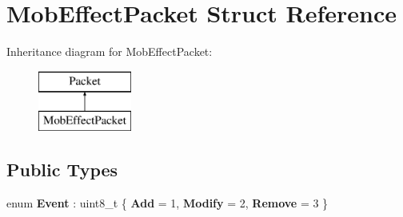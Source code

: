\hypertarget{struct_mob_effect_packet}{}\section{Mob\+Effect\+Packet Struct Reference}
\label{struct_mob_effect_packet}
Inheritance diagram for Mob\+Effect\+Packet\+:\begin{figure}[H]
\begin{center}
\leavevmode
\includegraphics[height=2.000000cm]{struct_mob_effect_packet}
\end{center}
\end{figure}
\subsection*{Public Types}
\begin{DoxyCompactItemize}
\item 
\mbox{\label{struct_mob_effect_packet_a15f23cfceed92391c5d108155828df62}} 
enum {\bfseries Event} \+: uint8\+\_\+t \{ {\bfseries Add} = 1, 
{\bfseries Modify} = 2, 
{\bfseries Remove} = 3
 \}
\end{DoxyCompactItemize}
